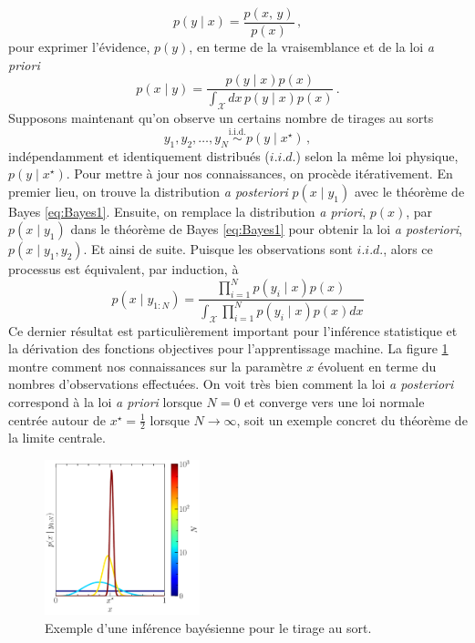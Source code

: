 \begin{equation}
        p(y \mid x) = \frac{p(x,\, y)}{p(x)} \, ,
\end{equation} 
pour exprimer l'évidence, $p(y)$, en terme de la vraisemblance et de la loi \textit{a priori} 
\begin{equation}
        p(x \mid y) = \frac{p(y \mid x) p(x)}{\int_\mathcal{X} dx\, p(y \mid x) p(x)} \, .
\end{equation} 
Supposons maintenant qu'on observe un certains nombre de tirages au sorts
\begin{equation*}
        y_1,y_2,\dots,y_N \overset{\mathrm{i.i.d.}}{\sim} p(y \mid x^{\star})\, ,
\end{equation*}
indépendamment et identiquement distribués ($i.i.d.$) selon la même loi physique, $p(y \mid x^{\star})$. Pour mettre à jour nos connaissances, on procède 
itérativement. En premier lieu, on trouve la distribution \textit{a posteriori} $p(x \mid y_1)$ avec le théorème de Bayes \eqref{eq:Bayes1}. Ensuite, 
on remplace la distribution \textit{a priori}, $p(x)$, par $p(x \mid y_1)$ dans le théorème de Bayes \eqref{eq:Bayes1} 
pour obtenir la loi \textit{a posteriori}, $p(x \mid y_1, y_2)$. Et ainsi de suite.
Puisque les observations sont $i.i.d.$, alors ce processus est équivalent, par induction, à 
\begin{equation}
        p(x \mid y_{1:N}) = \frac{\prod_{i=1}^{N} p(y_i \mid x) p(x)}{\int_\mathcal{X} \prod_{i=1}^{N}p(y_{i} \mid x) p(x) dx}
\end{equation} 
Ce dernier résultat est particulièrement important pour l'inférence statistique et la dérivation des fonctions 
objectives pour l'apprentissage machine. La figure \ref{fig:bayes update} montre comment nos connaissances 
sur la paramètre $x$ évoluent en terme du nombres d'observations effectuées. On voit très bien comment la loi \textit{a posteriori} 
correspond à la loi \textit{a priori} lorsque $N = 0$ et converge vers une loi normale centrée autour de $x^{\star}=\frac{1}{2}$ lorsque $N \rightarrow \infty$, 
soit un exemple concret du théorème de la limite centrale.
\begin{figure}[H]
        \centering
        \includegraphics[width=0.4\textwidth]{notebooks/toy_coin_toss.pdf}
        \caption{Exemple d'une inférence bayésienne pour le tirage au sort.}
        \label{fig:bayes update}
\end{figure}

